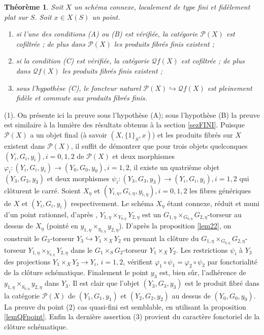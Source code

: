 \documentclass[11pt]{amsart}
\numberwithin{equation}{section}
\newtheorem{thm}{Th\'eor\`eme}[section]
\theoremstyle{definition}
\theoremstyle{remark}
\begin{document}
\begin{thm}\label{thmSGF}
Soit  $X$ un sch\'ema connexe, localement de type fini et fid\`element plat sur $S$. Soit $x\in X(S)$ un point.
\begin{enumerate}
\item si l'une des conditions (A) ou (B) est v\'erifi\'ee, la cat\'egorie $\mathcal{P}(X)$ est cofiltr\'ee ; de plus dans $\mathcal{P}(X)$ les produits fibr\'es finis existent ;
\item si la condition (C) est v\'erifi\'ee, la cat\'egorie  $\mathcal{Q}f(X)$ est cofiltr\'ee ; de plus dans $\mathcal{Q}f(X)$ les produits fibr\'es finis existent ;
\item sous l'hypoth\`ese (C), le foncteur naturel $\mathcal{P}(X)\hookrightarrow \mathcal{Q}f(X)$ est pleinement fid\`ele et commute aux produits fibr\'es finis.

\end{enumerate}
\end{thm}
\proof
(1). On pr\'esente ici la preuve sous l'hypoth\`ese (A); sous l'hypoth\`ese (B) la preuve est similaire \`a la lumi\`ere des r\'esultats obtenus \`a la section \ref{sezFINI}. Puisque $\mathcal{P}(X)$ a un objet final (\`a savoir $(X,\{1\}_S, x)$) et les produits fibr\'es sur $X$ existent dans $\mathcal{P}(X)$,
il suffit de d\'emontrer que  pour trois objets quelconques $(Y_i, G_i, y_i), i=0, 1 , 2$ de $\mathcal{P}(X)$ et deux morphismes
$\varphi_i:(Y_i, G_i, y_i)\to (Y_0, G_0, y_0), i=1, 2$, il existe un quatri\`eme objet $(Y_3, G_3, y_3)$ et deux morphismes
$\psi_i:(Y_3, G_3, y_3)\to (Y_i, G_i, y_i), i=1, 2$ qui cl\^oturent le carr\'e. Soient $X_{\eta}$ et
$(Y_{i,\eta}, G_{i,\eta}, y_{i,\eta}), i=0, 1, 2$ les fibres g\'en\'eriques de $X$ et $(Y_i, G_i, y_i)$ respectivement. Le sch\'ema $X_\eta $ \'etant connexe, r\'eduit et muni d'un point rationnel, d'apr\`es
\cite[Chapter II, Propositions 1 and 2]{Nor2}, $Y_{1,\eta}\times_{Y_{0,\eta}}Y_{2,\eta}$ est un $G_{1,\eta}\times_{G_{0,\eta}}G_{2,\eta}$-torseur au dessus de $X_{\eta}$
(point\'e en $y_{1,\eta}\times_{y_{0,\eta}}y_{2,\eta}$).
D'apr\`es la proposition \ref{lem22}, on construit le $G_3$-torseur $Y_3\hookrightarrow Y_1 \times _X Y_2$ en prenant la cl\^oture du
$G_{1,\eta}\times_{G_{0,\eta}}G_{2,\eta}$-torseur $Y_{1,\eta}\times_{Y_{0,\eta}}Y_{2,\eta}$ dans le $G_1\times_S G_2$-torseur
$Y_1\times_X Y_2$. Les restrictions $\psi _i$ \`a $Y_3$ des projections $Y_1 \times _X Y_2 \to Y_i$, $i=1,2$, v\'erifient
$\varphi _1 \circ \psi _1 = \varphi _2 \circ \psi _2$ par fonctorialit\'e de la cl\^oture sch\'ematique. Finalement le point $y_3$ est, bien s\^ur, l'adh\'erence de $y_{1,\eta}\times_{y_{0,\eta}}y_{2,\eta}$ dans $Y_3$. Il est clair que l'objet $(Y_3, G_3,y_3)$ est le produit fibr\'e dans la cat\'egorie $\mathcal{P}(X)$ de $(Y_1,G_1,y_1)$ et $(Y_2,G_2,y_2)$ au dessus de $(Y_0,G_0,y_0)$. La preuve du point (2) cas quasi-fini est semblable, en utilisant la proposition \ref{lemQFpoint}. Enfin la derni\`ere assertion (3) provient du caract\`ere fonctoriel de la cl\^oture sch\'ematique. \endproof
\end{document}
